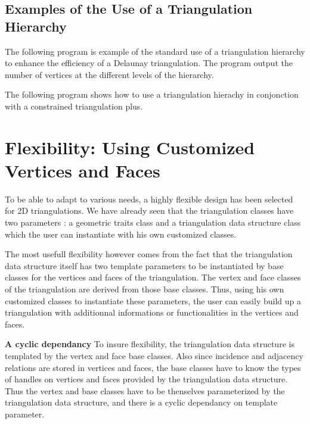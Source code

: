 \subsection{Examples of the Use of a  Triangulation Hierarchy}
\label{Subsection_2D_Triangulations_Hierarchy_Examples}

The following program is example
of the  standard use of a  triangulation hierarchy
to enhance the efficiency
of a Delaunay triangulation. The program output the number of vertices
at the different levels of the hierarchy.

The following program shows how to use
a triangulation hierachy in conjonction with a constrained 
triangulation plus.

\section{Flexibility: Using  Customized Vertices and Faces}
\label{Section_2D_Triangulations_Flexibility}


To be able to adapt to  various needs, a highly
flexible design has been  selected for 2D triangulations.
We have already seen that
the triangulation classes have two
parameters : a geometric traits class
and a triangulation data structure  class
which the user can instantiate with his own customized classes.

The most usefull flexibility however comes from the fact
that the triangulation data structure itself has two template
parameters to be instantiated by 
base classes for the vertices and faces of the triangulation.
The vertex and face classes of the triangulation are derived
from those base classes. 
Thus, using his own customized classes to instantiate these
parameters, the user can easily build up  a triangulation with additionnal
informations or functionalities in the vertices and faces.

{\bf A cyclic dependancy}
To insure flexibility, the triangulation data structure is templated by the
vertex and face base classes. Also since incidence and adjacency
relations are stored in vertices and faces, the base classes have to
know the types of handles on vertices and faces provided
by the triangulation data structure. Thus the vertex and base
classes have to be thenselves parameterized by the triangulation data
structure, and there is a cyclic dependancy on template parameter.

